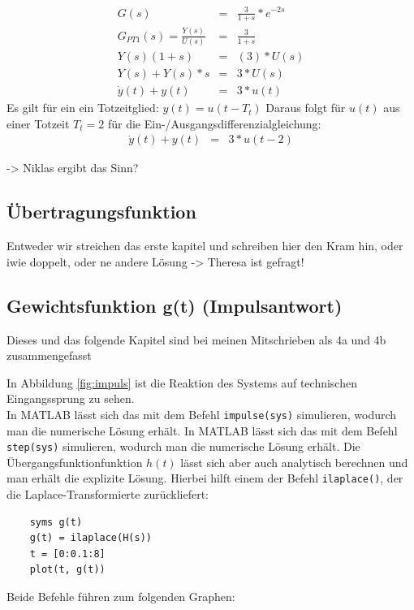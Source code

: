 \begin{eqnarray*}
    G(s) &=& \frac{3}{1 + s} * e^{-2s}\\
    G_{PT1}(s) =\frac{Y(s)}{U(s)} &=& \frac{3}{1 + s} \\
    Y(s)(1+s) &=& (3) * U(s) \\
    Y(s) + Y(s) *s &=& 3*U(s) \\
    \dot y(t) + y(t) &=& 3 * u(t) 
\end{eqnarray*}
Es gilt für ein ein Totzeitglied: $y(t) = u(t-T_t)$
Daraus folgt für $u(t)$ aus einer Totzeit $T_t = 2$ für die Ein-/Ausgangsdifferenzialgleichung:
\begin{eqnarray*}
    \dot y(t) + y(t) &=& 3 * u(t-2) 
\end{eqnarray*}

-> Niklas ergibt das Sinn? 
\subsection{Übertragungsfunktion}
Entweder wir streichen das erste kapitel und schreiben hier den Kram hin, oder iwie doppelt, oder ne andere Lösung -> Theresa ist gefragt!

\subsection{Gewichtsfunktion g(t) (Impulsantwort)}
Dieses und das folgende Kapitel sind bei meinen Mitschrieben als 4a und 4b zusammengefasst


In Abbildung \ref{fig:impuls} ist die Reaktion des Systems auf technischen Eingangssprung zu sehen.
\\
In MATLAB lässt sich das mit dem Befehl \texttt{impulse(sys)} simulieren, wodurch man die numerische Lösung erhält. In MATLAB lässt sich das mit dem Befehl \texttt{step(sys)} simulieren, wodurch man die numerische Lösung erhält. Die Übergangsfunktionfunktion $h(t)$ lässt sich aber auch analytisch berechnen und man erhält die explizite Lösung. Hierbei hilft einem der Befehl \texttt{ilaplace()}, der die Laplace-Transformierte zurückliefert:
\begin{lstlisting}
    syms g(t)
    g(t) = ilaplace(H(s))
    t = [0:0.1:8]
    plot(t, g(t))
\end{lstlisting}

Beide Befehle führen zum folgenden Graphen:



